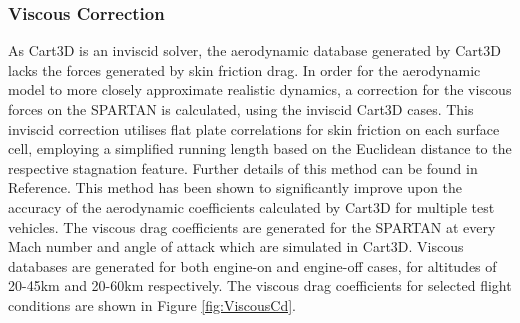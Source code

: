 		
		\subsubsection{Viscous Correction}
		
		As Cart3D is an inviscid solver, the aerodynamic database generated by Cart3D lacks the forces generated by skin friction drag. In order for the aerodynamic model to more closely approximate realistic dynamics, a correction for the viscous forces on the SPARTAN is calculated, using the inviscid Cart3D cases. This inviscid correction utilises flat plate correlations for skin friction on each surface cell, employing a simplified running length based on the Euclidean distance to the respective stagnation feature. Further details of this method can be found in Reference\cite{Ward2018}. This method has been shown to significantly improve upon the accuracy of the aerodynamic coefficients calculated by Cart3D for multiple test vehicles\cite{Ward2018}. The viscous drag coefficients are generated for the SPARTAN at every Mach number and angle of attack which are simulated in Cart3D. Viscous databases are generated for both engine-on and engine-off cases, for altitudes of 20-45km and 20-60km respectively. The viscous drag coefficients for selected flight conditions are shown in Figure \ref{fig:ViscousCd}.
		
